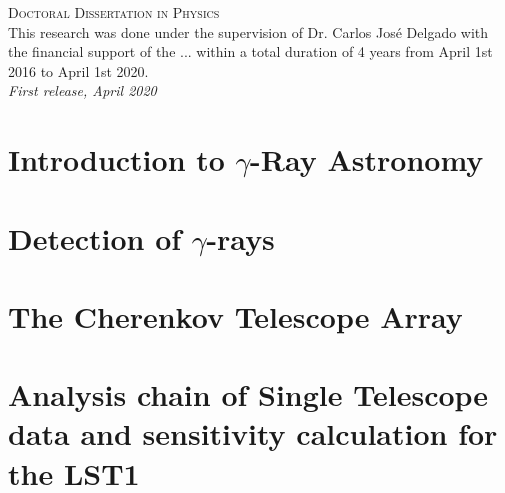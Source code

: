 \documentclass[12pt,fleqn,aas_macros]{book} %
\begin{document}

\noindent \textsc{Doctoral Dissertation in Physics}\\

\noindent This research was done under the supervision of Dr. Carlos José Delgado with the financial support of the ... within a total duration of 4 years from April 1st 2016 to April 1st 2020.\\ %

\noindent \textit{First release, April 2020} %
\fi


\pagestyle{empty} %

\tableofcontents %


\pagestyle{fancy} %



\chapter{Introduction to $\gamma$-Ray Astronomy}



\chapter{Detection of $\gamma$-rays}



\chapter{The Cherenkov Telescope Array} \label{cap:CTA}


\chapter[Analysis chain of Single Telescope data and...]{Analysis chain of Single Telescope data and sensitivity calculation for the LST1} \label{cap:LST1}



\printbibliography
\printglossaries
\end{document}

